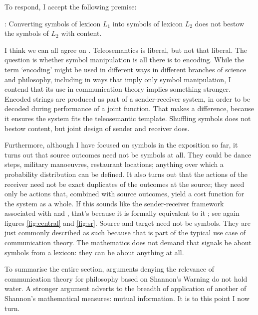 To respond, I accept the following premise:

\begin{myquote}
\smi{}: Converting symbols of lexicon $L_1$ into symbols of lexicon $L_2$ does not bestow the symbols of $L_2$ with content.
\end{myquote}

\noindent I think we can all agree on \smi{}.
Teleosemantics is liberal, but not that liberal.
The question is whether symbol manipulation is all there is to encoding.
While the term `encoding' might be used in different ways in different branches of science and philosophy, including in ways that imply only symbol manipulation, I contend that its use in communication theory implies something stronger.
Encoded strings are produced as part of a sender-receiver system, in order to be decoded during performance of a joint function.
That makes a difference, because it ensures the system fits the teleosemantic template.
Shuffling symbols does not bestow content, but joint design of sender and receiver does.

Furthermore, although I have focused on symbols in the exposition so far, it turns out that source outcomes need not be symbols at all.
They could be dance steps, military manoeuvres, restaurant locations; anything over which a probability distribution can be defined.
It also turns out that the actions of the receiver need not be exact duplicates of the outcomes at the source; they need only be actions that, combined with source outcomes, yield a cost function for the system as a whole.
If this sounds like the sender-receiver framework associated with \citet{skyrms2010signals} and \citet{lewis1969convention}, that's because it is formally equivalent to it \citep{martinez2019deception}; see again figures \ref{fig:central} and \ref{fig:sr}.
Source and target need not be symbols.
They are just commonly described as such because that is part of the typical use case of communication theory.
The mathematics does not demand that signals be about symbols from a lexicon: they can be about anything at all.

To summarise the entire section, arguments denying the relevance of communication theory for philosophy based on {\sc Shannon's Warning} do not hold water.
A stronger argument adverts to the breadth of application of another of Shannon's mathematical measures: mutual information.
It is to this point I now turn.


